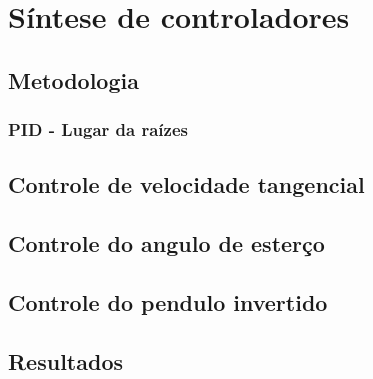 \chapter{Síntese de controladores}%
    \label{chp:software}
    \section{Metodologia}
		\subsection{PID - Lugar da raízes}
	\section{Controle de velocidade tangencial}
	\section{Controle do angulo de esterço}
	\section{Controle do pendulo invertido}
	\section{Resultados}